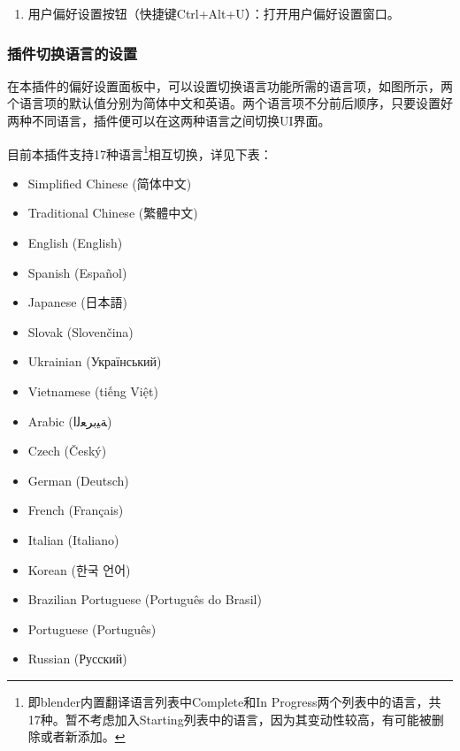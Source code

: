 \documentclass{../../public_resources/doc}
\begin{document}
\begin{enumerate}
\begin{enumerate}
        \item 加载我的设置按钮：部署我个人的偏好设置。所涉及的设置选项详见\hyperlink{MySettings}{我的设置}。该功能默认会覆盖你原有的blender设置（启动文件和偏好设置），请详细了解所涉及的设置项后再确认是否使用该功能。\footnote{理论上支持任意系统、任意安装路径、任意显卡平台的情况，但Linux OS和Mac OS比较少测试，可能会存在有bug。}
        \item 加载初始设置按钮：加载初始的偏好设置和启动文件，即重置blender，还原成初次安装blender时的状态。
    \end{enumerate}
    \item 用户偏好设置按钮（快捷键Ctrl+Alt+U）：打开用户偏好设置窗口。
\end{enumerate}

\subsubsection{插件切换语言的设置}
在本插件的偏好设置面板中，可以设置切换语言功能所需的语言项，如图所示，两个语言项的默认值分别为简体中文和英语。两个语言项不分前后顺序，只要设置好两种不同语言，插件便可以在这两种语言之间切换UI界面。

目前本插件支持17种语言\footnote{即blender内置翻译语言列表中Complete和In Progress两个列表中的语言，共17种。暂不考虑加入Starting列表中的语言，因为其变动性较高，有可能被删除或者新添加。}相互切换，详见下表：

\begin{itemize}
    \item Simplified Chinese (简体中文)
    \item Traditional Chinese (繁體中文)
    \item English (English)
    \item Spanish (Español)
    \item Japanese (日本語)
    \item Slovak (Slovenčina)
    \item Ukrainian (Український)
    \item Vietnamese (tiếng Việt)
    \item Arabic (ﺔﻴﺑﺮﻌﻟﺍ)
    \item Czech (Český)
    \item German (Deutsch)
    \item French (Français)
    \item Italian (Italiano)
    \item Korean (한국 언어)
    \item Brazilian Portuguese (Português do Brasil)
    \item Portuguese (Português)
    \item Russian (Русский)
\end{itemize}
\end{document}
